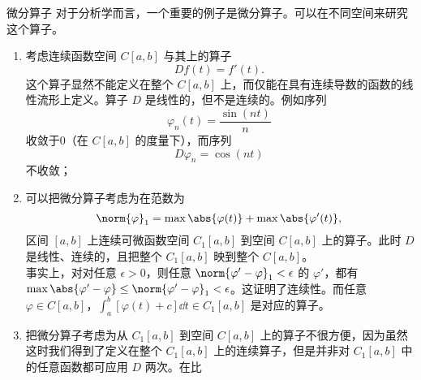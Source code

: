 \begin{example}{微分算子}
对于分析学而言，一个重要的例子是微分算子。可以在不同空间来研究这个算子。

\begin{enumerate}
\item 考虑连续函数空间 $C[a,b]$ 与其上的算子 
\begin{equation}
Df(t)=f'(t).~
\end{equation}
这个算子显然不能定义在整个 $C[a,b]$ 上，而仅能在具有连续导数的函数的线性流形上定义。算子 $D$ 是线性的，但不是连续的。例如序列
\begin{equation}
\varphi_n(t)=\frac{\sin(nt)}{n}~
\end{equation}
收敛于0（在 $C[a,b]$ 的度量下），而序列
\begin{equation}
D\varphi_n=\cos(nt)~
\end{equation}
不收敛；
\item 可以把微分算子考虑为在范数为
\begin{equation}
\norm{\varphi}_1=\max\abs{\varphi(t)}+\max\abs{\varphi'(t)},~
\end{equation}
区间 $[a,b]$ 上连续可微函数空间 $C_1[a,b]$ 到空间 $C[a,b]$ 上的算子。此时 $D$ 是线性、连续的，且把整个 $C_1[a,b]$ 映到整个 $C[a,b]$。\\
事实上，对对任意 $\epsilon>0$，则任意 $\norm{\varphi'-\varphi}_1<\epsilon$ 的 $\varphi'$，都有 $\max\abs{\varphi'-\varphi}\leq \norm{\varphi'-\varphi}_1<\epsilon$。这证明了连续性。而任意 $\varphi\in C[a,b]$，$\int_a^b[\varphi(t)+c]\dd t\in C_1[a,b]$ 是对应的算子。

\item 把微分算子考虑为从 $C_1[a,b]$ 到空间 $C[a,b]$ 上的算子不很方便，因为虽然这时我们得到了定义在整个 $C_1[a,b]$ 上的连续算子，但是并非对 $C_1[a,b]$ 中的任意函数都可应用 $D$ 两次。在比 $$
\end{enumerate}
\end{example}



